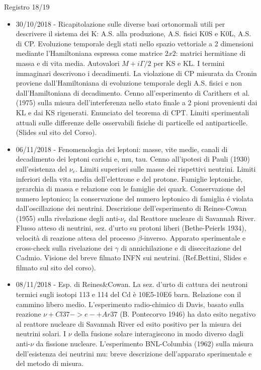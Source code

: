 \begin{frame}[allowframebreaks]{Registro 18/19}
\begin{itemize}
\item 30/10/2018 - Ricapitolazione sulle diverse basi ortonormali utili per descrivere il sistema dei K: A.S. alla produzione, A.S. fisici K0S e K0L, A.S. di CP. Evoluzione temporale degli stati nello spazio vettoriale a 2 dimensioni mediante l'Hamiltoniana espressa come matrice $2x2$: matrici hermitiane di massa e di vita media. Autovalori $M+i\Gamma/2$ per KS e KL. I termini immaginari descrivono i decadimenti. La violazione di CP misurata da Cronin proviene dall'Hamiltoniana di evoluzione temporale degli A.S. fisici e non dall'Hamiltoniana di decadimento. Cenno all'esperimento di Carithers et al.(1975) sulla misura dell'interferenza nello stato finale a 2 pioni provenienti dai KL e dai KS rigenerati. Enunciato del teorema di CPT. Limiti sperimentali attuali sulle differenze delle osservabili fisiche di particelle ed antiparticelle. (Slides sul sito del Corso).
\item 06/11/2018 - Fenomenologia dei leptoni: masse, vite medie, canali di decadimento dei leptoni carichi e, mu, tau. Cenno all'ipotesi di Pauli (1930) sull'esistenza del $\nu_e$. Limiti superiori sulle masse dei rispettivi neutrini. Limiti inferiori della vita media dell'elettrone e del protone. Famiglie leptoniche, gerarchia di massa e relazione con le famiglie dei quark. Conservazione del numero leptonico; la conservazione del numero leptonico di famiglia \'e violata dall'oscillazione dei neutrini. Descrizione dell'esperimento di Reines-Cowan (1955) sulla rivelazione degli anti-$\nu_e$ dal Reattore nucleare di Savannah River. Flusso atteso di neutrini, sez. d'urto su protoni liberi (Bethe-Peierls 1934), velocità di reazione attesa del processo $\beta$-inverso. Apparato sperimentale e cross-check sulla rivelazione dei $\gamma$ di annichilazione e di diseccitazione del Cadmio. Visione del breve filmato INFN sui neutrini. (Ref.Bettini, Slides e filmato sul sito del corso).
\item 08/11/2018 - Esp. di Reines\&Cowan. La sez. d'urto di cattura dei neutroni termici sugli isotopi 113 e 114 del Cd è 10E5-10E6 barn. Relazione con il cammino libero medio. L'esperimento radio-chimico di Davis, basato sulla reazione $\nu+Cl37->e- + Ar37$ (B. Pontecorvo 1946) ha dato esito negativo al reattore nucleare di Savannah River ed esito positivo per la misura dei neutrini solari. I $\nu$ della fusione solare interagiscono in modo diverso dagli anti-$\nu$ da fissione nucleare. L'esperimento BNL-Columbia (1962) sulla misura dell'esistenza dei neutrini mu: breve descrizione dell'apparato sperimentale e del metodo di misura.

\end{itemize}
\end{frame}
